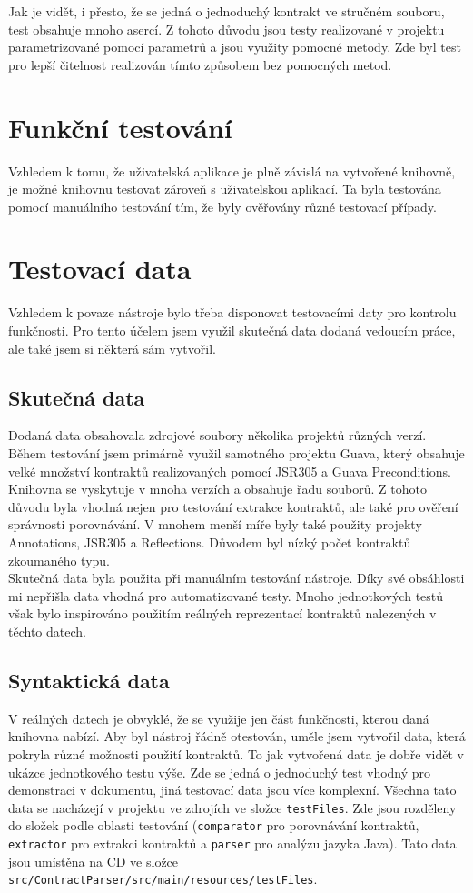 				Jak je vidět, i přesto, že se jedná o jednoduchý kontrakt ve stručném souboru, test obsahuje mnoho asercí. Z tohoto důvodu jsou testy realizované v projektu parametrizované pomocí parametrů a jsou využity pomocné metody. Zde byl test pro lepší čitelnost realizován tímto způsobem bez pomocných metod.
				
		
	\section{Funkční testování}
		Vzhledem k tomu, že uživatelská aplikace je plně závislá na vytvořené knihovně, je možné knihovnu testovat zároveň s uživatelskou aplikací. Ta byla testována pomocí manuálního testování tím, že byly ověřovány různé testovací případy.
			
	\section{Testovací data}
		Vzhledem k povaze nástroje bylo třeba disponovat testovacími daty pro kontrolu funkčnosti. Pro tento účelem jsem využil skutečná data dodaná vedoucím práce, ale také jsem si některá sám vytvořil.
		
		\subsection{Skutečná data}
			Dodaná data obsahovala zdrojové soubory několika projektů různých verzí. Během testování jsem primárně využil samotného projektu Guava, který obsahuje velké množství kontraktů realizovaných pomocí JSR305 a Guava Preconditions. Knihovna se vyskytuje v mnoha verzích a obsahuje řadu souborů. Z tohoto důvodu byla vhodná nejen pro testování extrakce kontraktů, ale také pro ověření správnosti porovnávání. V mnohem menší míře byly také použity projekty Annotations, JSR305 a Reflections. Důvodem byl nízký počet kontraktů zkoumaného typu.\\
			
			Skutečná data byla použita při manuálním testování nástroje. Díky své obsáhlosti mi nepřišla data vhodná pro automatizované testy. Mnoho jednotkových testů však bylo inspirováno použitím reálných reprezentací kontraktů nalezených v těchto datech.
			
		\subsection{Syntaktická data}
			V reálných datech je obvyklé, že se využije jen část funkčnosti, kterou daná knihovna nabízí. Aby byl nástroj řádně otestován, uměle jsem vytvořil data, která pokryla různé možnosti použití kontraktů. To jak vytvořená data je dobře vidět v ukázce jednotkového testu výše. Zde se jedná o jednoduchý test vhodný pro demonstraci v dokumentu, jiná testovací data jsou více komplexní. Všechna tato data se nacházejí v projektu ve zdrojích ve složce \texttt{testFiles}. Zde jsou rozděleny do složek podle oblasti testování (\texttt{comparator} pro porovnávání kontraktů, \texttt{extractor} pro extrakci kontraktů a \texttt{parser} pro analýzu jazyka Java). Tato data jsou umístěna na CD ve složce \texttt{src/ContractParser/src/main/resources/testFiles}.		 
		 

